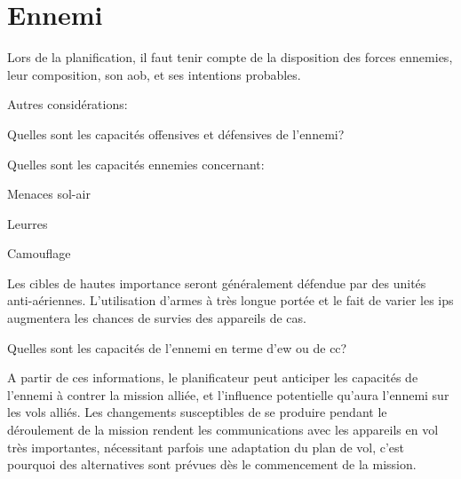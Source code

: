 \newpage
\section{Ennemi}

Lors de la planification, il faut tenir compte de la disposition des forces ennemies, leur composition, son \gls{aob}, et ses intentions probables.

\begin{e1}
	\item Autres considérations:
	\begin{e2}
		\item Quelles sont les capacités offensives et défensives de l'ennemi?
		\item Quelles sont les capacités ennemies concernant:
		\begin{e3}
			\item Menaces sol-air
			\item Leurres
			\item Camouflage
		\end{e3}
		Les cibles de hautes importance seront généralement défendue par des unités anti-aériennes. L'utilisation d'armes à très longue portée et le fait de varier les \glspl{ip} augmentera les chances de survies des appareils de \gls{cas}.
		\item Quelles sont les capacités de l'ennemi en terme d'\gls{ew} ou de \gls{cc}?
	\end{e2}
	\item A partir de ces informations, le planificateur peut anticiper les capacités de l'ennemi à contrer la mission alliée, et l'influence potentielle qu'aura l'ennemi sur les vols alliés. Les changements susceptibles de se produire pendant le déroulement de la mission rendent les communications avec les appareils en vol très importantes, nécessitant parfois une adaptation du plan de vol, c'est pourquoi des alternatives sont prévues dès le commencement de la mission.
\end{e1}